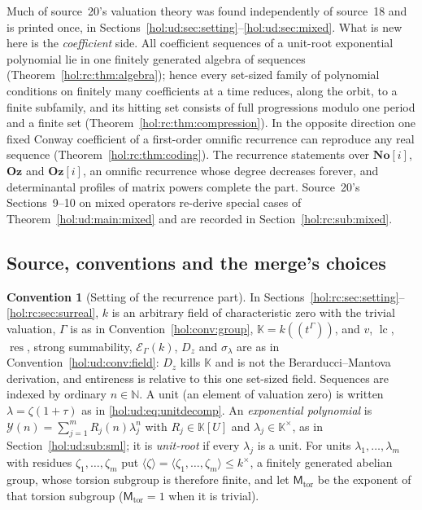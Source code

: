 \documentclass[11pt]{article}
\numberwithin{equation}{section}
\theoremstyle{definition}
\newtheorem{convention}[theorem]{Convention}
\theoremstyle{remark}
\newcommand{\N}{\mathbb N}
\newcommand{\No}{\mathbf{No}}
\newcommand{\lc}{\operatorname{lc}}
\newcommand{\res}{\operatorname{res}}
\newcommand{\KK}{\mathbb K}
\newcommand{\EK}{\mathcal E_\Gamma(k)}
\newcommand{\Oz}{\mathbf{Oz}}
\begin{document}
Much of source~20's valuation theory was found independently of source~18 and
is printed once, in Sections~\ref{hol:ud:sec:setting}--\ref{hol:ud:sec:mixed}.
What is new here is the \emph{coefficient} side. All coefficient sequences of
a unit-root exponential polynomial lie in one finitely generated algebra of
sequences (Theorem~\ref{hol:rc:thm:algebra}); hence every set-sized family of
polynomial conditions on finitely many coefficients at a time reduces, along
the orbit, to a finite subfamily, and its hitting set consists of full
progressions modulo one period and a finite set
(Theorem~\ref{hol:rc:thm:compression}). In the opposite direction one fixed
Conway coefficient of a first-order omnific recurrence can reproduce any real
sequence (Theorem~\ref{hol:rc:thm:coding}). The recurrence statements over
$\No[i]$, $\Oz$ and $\Oz[i]$, an omnific recurrence whose degree decreases
forever, and determinantal profiles of matrix powers complete the part.
Source~20's Sections~9--10 on mixed operators re-derive special cases of
Theorem~\ref{hol:ud:main:mixed} and are recorded in
Section~\ref{hol:rc:sub:mixed}.

\subsection{Source, conventions and the merge's choices}
\label{hol:rc:sub:conventions}

\begin{convention}[Setting of the recurrence part]
\label{hol:rc:conv:field}
In Sections~\ref{hol:rc:sec:setting}--\ref{hol:rc:sec:surreal}, $k$ is an
arbitrary field of characteristic zero with the trivial valuation, $\Gamma$ is
as in Convention~\ref{hol:conv:group}, $\KK=k((t^\Gamma))$, and $v$, $\lc$,
$\res$, strong summability, $\EK$, $D_z$ and $\sigma_\lambda$ are as in
Convention~\ref{hol:ud:conv:field}: $D_z$ kills $\KK$ and is not the
Berarducci--Mantova derivation, and entireness is relative to this one
set-sized field. Sequences are indexed by ordinary $n\in\N$. A unit (an
element of valuation zero) is written $\lambda=\zeta(1+\tau)$ as in
\eqref{hol:ud:eq:unitdecomp}. An \emph{exponential polynomial} is
$\mathcal Y(n)=\sum_{j=1}^mR_j(n)\lambda_j^n$ with $R_j\in\KK[U]$ and
$\lambda_j\in\KK^\times$, as in Section~\ref{hol:ud:sub:sml}; it is
\emph{unit-root} if every $\lambda_j$ is a unit. For units
$\lambda_1,\ldots,\lambda_m$ with residues $\zeta_1,\ldots,\zeta_m$ put
$\langle\zeta\rangle=\langle\zeta_1,\ldots,\zeta_m\rangle\le k^\times$, a
finitely generated abelian group, whose torsion subgroup is therefore finite,
and let $\mathsf M_{\mathrm{tor}}$ be the exponent of that torsion subgroup
($\mathsf M_{\mathrm{tor}}=1$ when it is trivial).
\end{convention}
\end{document}
